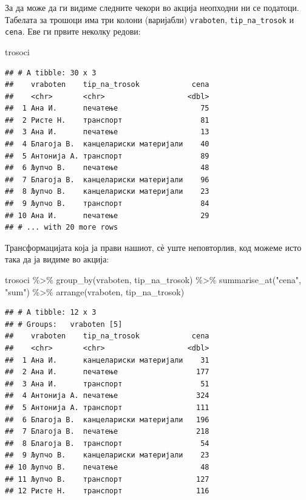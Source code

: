 \documentclass[
]{book}
\newenvironment{Shaded}{\begin{snugshade}}{\end{snugshade}}
\newcommand{\FunctionTok}[1]{\textcolor[rgb]{0.00,0.00,0.00}{#1}}
\newcommand{\NormalTok}[1]{#1}
\newcommand{\SpecialCharTok}[1]{\textcolor[rgb]{0.00,0.00,0.00}{#1}}
\newcommand{\StringTok}[1]{\textcolor[rgb]{0.31,0.60,0.02}{#1}}
\begin{document}
За да може да ги видиме следните чекори во акција неопходни ни се податоци. Табелата за трошоци има три колони (варијабли) \texttt{vraboten}, \texttt{tip\_na\_trosok} и \texttt{cena}. Еве ги првите неколку редови:

\begin{Shaded}
\begin{Highlighting}[]
\NormalTok{trosoci}
\end{Highlighting}
\end{Shaded}

\begin{verbatim}
## # A tibble: 30 x 3
##    vraboten    tip_na_trosok            cena
##    <chr>       <chr>                   <dbl>
##  1 Ана И.      печатење                   75
##  2 Ристе Н.    транспорт                  81
##  3 Ана И.      печатење                   13
##  4 Благоја В.  канцелариски материјали    40
##  5 Антонија А. транспорт                  89
##  6 Љупчо В.    печатење                   48
##  7 Благоја В.  канцелариски материјали    96
##  8 Љупчо В.    канцелариски материјали    23
##  9 Љупчо В.    транспорт                  84
## 10 Ана И.      печатење                   29
## # ... with 20 more rows
\end{verbatim}

Трансформацијата која ја прави нашиот, сѐ уште неповторлив, код можеме исто така да ја видиме во акција:

\begin{Shaded}
\begin{Highlighting}[]
\NormalTok{trosoci }\SpecialCharTok{\%\textgreater{}\%} 
  \FunctionTok{group\_by}\NormalTok{(vraboten, tip\_na\_trosok) }\SpecialCharTok{\%\textgreater{}\%} 
  \FunctionTok{summarise\_at}\NormalTok{(}\StringTok{"cena"}\NormalTok{, }\StringTok{"sum"}\NormalTok{) }\SpecialCharTok{\%\textgreater{}\%} 
  \FunctionTok{arrange}\NormalTok{(vraboten, tip\_na\_trosok)}
\end{Highlighting}
\end{Shaded}

\begin{verbatim}
## # A tibble: 12 x 3
## # Groups:   vraboten [5]
##    vraboten    tip_na_trosok            cena
##    <chr>       <chr>                   <dbl>
##  1 Ана И.      канцелариски материјали    31
##  2 Ана И.      печатење                  177
##  3 Ана И.      транспорт                  51
##  4 Антонија А. печатење                  324
##  5 Антонија А. транспорт                 111
##  6 Благоја В.  канцелариски материјали   196
##  7 Благоја В.  печатење                  218
##  8 Благоја В.  транспорт                  54
##  9 Љупчо В.    канцелариски материјали    23
## 10 Љупчо В.    печатење                   48
## 11 Љупчо В.    транспорт                 127
## 12 Ристе Н.    транспорт                 116
\end{verbatim}
\end{document}
